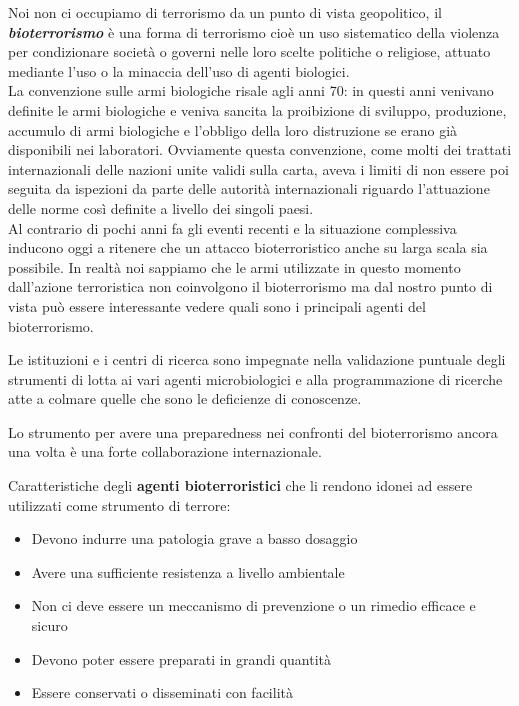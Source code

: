 Noi non ci occupiamo di terrorismo da un punto di vista geopolitico, il
\textbf{\emph{bioterrorismo}} è una forma di terrorismo cioè un uso
sistematico della violenza per condizionare società o governi nelle loro
scelte politiche o religiose, attuato mediante l'uso o la minaccia
dell'uso di agenti biologici.\\
La convenzione sulle armi biologiche risale agli anni 70: in questi anni
venivano definite le armi biologiche e veniva sancita la proibizione di
sviluppo, produzione, accumulo di armi biologiche e l'obbligo della loro
distruzione se erano già disponibili nei laboratori. Ovviamente questa
convenzione, come molti dei trattati internazionali delle nazioni unite
validi sulla carta, aveva i limiti di non essere poi seguita da
ispezioni da parte delle autorità internazionali riguardo l'attuazione
delle norme così definite a livello dei singoli paesi.\\
Al contrario di pochi anni fa gli eventi recenti e la situazione
complessiva inducono oggi a ritenere che un attacco bioterroristico
anche su larga scala sia possibile. In realtà noi sappiamo che le armi
utilizzate in questo momento dall'azione terroristica non coinvolgono il
bioterrorismo ma dal nostro punto di vista può essere interessante
vedere quali sono i principali agenti del bioterrorismo.

Le istituzioni e i centri di ricerca sono impegnate nella validazione
puntuale degli strumenti di lotta ai vari agenti microbiologici e alla
programmazione di ricerche atte a colmare quelle che sono le deficienze
di conoscenze.

Lo strumento per avere una preparedness nei confronti del bioterrorismo
ancora una volta è una forte collaborazione internazionale.

Caratteristiche degli \textbf{agenti bioterroristici} che li rendono
idonei ad essere utilizzati come strumento di terrore:

\begin{itemize}
\item
  Devono indurre una patologia grave a basso dosaggio
\item
  Avere una sufficiente resistenza a livello ambientale
\item
  Non ci deve essere un meccanismo di prevenzione o un rimedio efficace
  e sicuro
\item
  Devono poter essere preparati in grandi quantità
\item
  Essere conservati o disseminati con facilità
\end{itemize}


